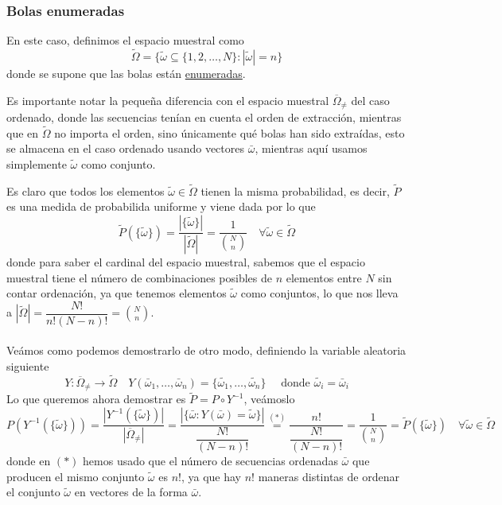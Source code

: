 \subsubsection{Bolas enumeradas}
\noindent
En este caso, definimos el espacio muestral como
\begin{equation*}
    \tilde{\Omega} = \{\tilde{\omega} \subseteq \{1, 2, \ldots, N\}: |\tilde{\omega}| = n\}
\end{equation*}
donde se supone que las bolas están \underline{enumeradas}.
\begin{observacion}
    Es importante notar la pequeña diferencia con el espacio muestral $\overline{\Omega}_{\neq}$ del caso ordenado, donde las secuencias tenían en cuenta el orden de extracción, mientras que en $\tilde{\Omega}$ no importa el orden, sino únicamente qué bolas han sido extraídas, esto se almacena en el caso ordenado usando vectores $\bar{\omega}$, mientras aquí usamos simplemente $\tilde{\omega}$ como conjunto.
\end{observacion}
\noindent
Es claro que todos los elementos $\tilde{\omega}\in \tilde{\Omega}$ tienen la misma probabilidad, es decir, $\tilde{P}$ es una medida de probabilida uniforme y viene dada por lo que 
\begin{equation*}
    \tilde{P}(\{\tilde{\omega}\})=\dfrac{|\{\tilde{\omega}\}|}{|\tilde{\Omega}|}=\dfrac{1}{\binom{N}{n}} \quad \forall \tilde{\omega}\in \tilde{\Omega}
\end{equation*} 
donde para saber el cardinal del espacio muestral, sabemos que el espacio muestral tiene el número de combinaciones posibles de $n$ elementos entre $N$ sin contar ordenación, ya que tenemos elementos $\tilde{\omega}$ como conjuntos, lo que nos lleva a $|\tilde{\Omega}|=\dfrac{N!}{n!(N-n)!}=\binom{N}{n}$. \\ \\
\noindent
Veámos como podemos demostrarlo de otro modo, definiendo la variable aleatoria siguiente
\begin{equation*}
    Y:\overline{\Omega}_{\neq} \to \tilde{\Omega} \quad Y(\bar{\omega}_1, \ldots, \bar{\omega}_n) = \{\tilde{\omega_1}, \ldots, \tilde{\omega_n}\} \quad \text{ donde } \tilde{\omega_i} = \bar{\omega}_i
\end{equation*}
Lo que queremos ahora demostrar es $\tilde{P} = P \circ Y^{-1}$, veámoslo
\begin{equation*}
    P(Y^{-1}(\{\tilde{\omega}\})) = \dfrac{|Y^{-1}(\{\tilde{\omega}\})|}{|\overline{\Omega}_{\neq}|}= \dfrac{|\{\bar{\omega} : Y(\bar{\omega})=\tilde{\omega}\}|}{\dfrac{N!}{(N-n)!}} \overset{(*)}{=} \dfrac{n!}{\dfrac{N!}{(N-n)!}} = \dfrac{1}{\binom{N}{n}} = \tilde{P}(\{\tilde{\omega}\}) \quad \forall \tilde{\omega}\in \tilde{\Omega}
\end{equation*}
donde en $(*)$ hemos usado que el número de secuencias ordenadas $\bar{\omega}$ que producen el mismo conjunto $\tilde{\omega}$ es $n!$, ya que hay $n!$ maneras distintas de ordenar el conjunto $\tilde{\omega}$ en vectores de la forma $\bar{\omega}$.

